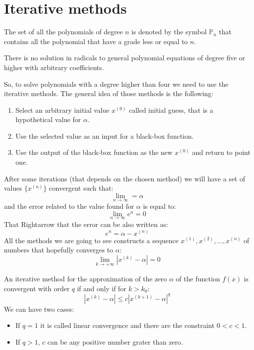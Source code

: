 \documentclass[12pt, a4paper]{report}
\newtheorem[style=M,bodystyle=\normalfont]{theorem}{Theorem}
\newtheorem[style=M,bodystyle=\normalfont]{proposition}{Proposition}
\newtheorem[style=M,bodystyle=\normalfont]{corollary}{Corollary}
\newtheorem[style=M,bodystyle=\normalfont]{lemma}{Lemma}
\newtheorem[style=M,bodystyle=\normalfont]{definition}{Definition}
\begin{document}
    \section{Iterative methods}
    The set of all the polynomials of degree $n$ is denoted by the symbol $\mathbb{P}_n$ that contains all the polynomial that have a grade less or equal to $n$.
    \begin{theorem}
        There is no solution in radicals to general polynomial equations of degree five or higher with arbitrary coefficients. 
    \end{theorem}
    So, to solve polynomials with a degree higher than four we need to use the iterative methods. The general idea of those methods is the following:
    \begin{enumerate}
        \item Select an arbitrary initial value $x^{(0)}$ called initial guess, that is a hypothetical value for $\alpha$.
        \item Use the selected value as an input for a black-box function.
        \item Use the output of the black-box function as the new $x^{(0)}$ and return to point one. 
    \end{enumerate}
    After some iterations (that depends on the chosen method) we will have a set of values $\{ x^{(n)} \}$ convergent such that:
    \[ \lim_{n \rightarrow \infty} = \alpha\]
    and the error related to the value found for $\alpha$ is equal to: 
    \[ \lim_{n \rightarrow \infty}e^n = 0\]
    That Rightarrow that the error can be also written as: 
    \[e^n=\alpha-x^{(n)}\]
    All the methods we are going to see constructs a sequence $x^{(1)},x^{(2)},\dots,x^{(n)}$ of numbers that hopefully converges to $\alpha$:
    \[ \lim_{k \rightarrow + \infty} \left\lvert x^{(k)}-\alpha \right\rvert =0\]
    \begin{definition}
        An iterative method for the approximation of the zero $\alpha$ of the function $f(x)$ is convergent with order $q$ if and only if for $k > k_0$:
        \[\left\lvert x^{(k)} - \alpha \right\rvert \leq c {\left\lvert x^{(k+1)} - \alpha \right\rvert}^q  \]
        We can have two cases:
        \begin{itemize}
            \item If $q=1$ it is called linear convergence and there are the constraint $0<c<1$.
            \item If $q>1$, $c$ can be any positive number grater than zero. 
        \end{itemize}
    \end{definition}
\end{document}
